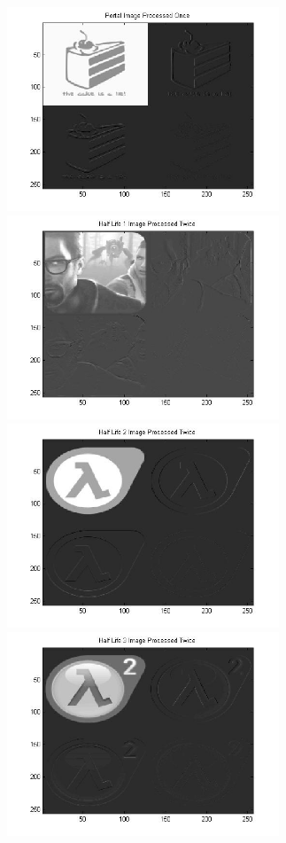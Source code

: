 \documentclass[11 pt]{article}
\begin{document}
\begin{center}
\includegraphics[width=3.2in]{Figure_9.jpg} \includegraphics[width=3.2in]{Figure_10.jpg}\\
\includegraphics[width=3.2in]{Figure_11.jpg} \includegraphics[width=3.2in]{Figure_12.jpg}
\end{center}
\end{document}
